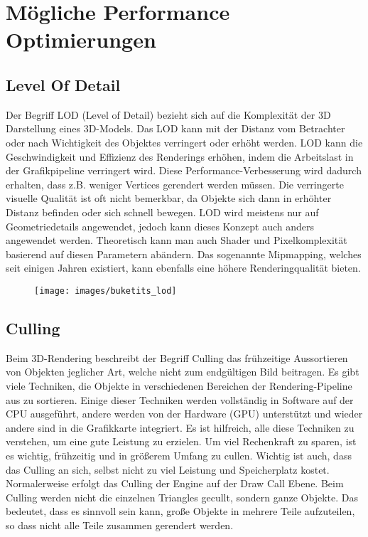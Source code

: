 \chapter{Mögliche Performance Optimierungen}
\section{Level Of Detail}
Der Begriff LOD (Level of Detail) bezieht sich auf die Komplexität der 3D Darstellung eines 3D-Models. Das LOD kann mit der Distanz vom Betrachter oder nach Wichtigkeit des Objektes verringert oder erhöht werden. LOD kann die Geschwindigkeit und Effizienz des Renderings erhöhen, indem die Arbeitslast in der Grafikpipeline verringert wird. Diese Performance-Verbesserung wird dadurch erhalten, dass z.B. weniger Vertices gerendert werden müssen. Die verringerte visuelle Qualität ist oft nicht bemerkbar, da Objekte sich dann in erhöhter Distanz befinden oder sich schnell bewegen. LOD wird meistens nur auf Geometriedetails angewendet, jedoch kann dieses Konzept auch anders angewendet werden. Theoretisch kann man auch Shader und Pixelkomplexität basierend auf diesen Parametern abändern. Das sogenannte Mipmapping, welches seit einigen Jahren existiert, kann ebenfalls eine höhere Renderingqualität bieten.

\begin{figure}[h]
	\centering
	\texttt{[image: images/buketits\_lod]}
	\caption{\cite{_lod_formeshes}}
\end{figure}


\section{Culling}
Beim 3D-Rendering beschreibt der Begriff Culling das frühzeitige Aussortieren von Objekten jeglicher Art, welche nicht zum endgültigen Bild beitragen. Es gibt viele Techniken, die Objekte in verschiedenen Bereichen der Rendering-Pipeline aus zu sortieren. Einige dieser Techniken werden vollständig in Software auf der CPU ausgeführt, andere werden von der Hardware (GPU) unterstützt und wieder andere sind in die Grafikkarte integriert. Es ist hilfreich, alle diese Techniken zu verstehen, um eine gute Leistung zu erzielen. Um viel Rechenkraft zu sparen, ist es wichtig, frühzeitig und in größerem Umfang zu cullen. Wichtig ist auch, dass das Culling an sich, selbst nicht zu viel Leistung und Speicherplatz kostet.
Normalerweise erfolgt das Culling der Engine auf der Draw Call Ebene. Beim Culling werden nicht die einzelnen Triangles gecullt, sondern ganze Objekte. Das bedeutet, dass es sinnvoll sein kann, große Objekte in mehrere Teile aufzuteilen, so dass nicht alle Teile zusammen gerendert werden.


